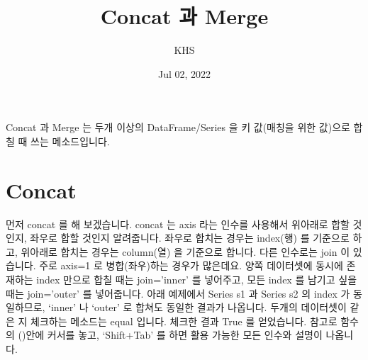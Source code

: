 \documentclass[letterpaper,10pt,english]{jupyterBook}
\title{Concat 과 Merge}
\date{Jul 02, 2022}
\author{KHS}
\begin{document}
\pagestyle{empty}
\sphinxmaketitle
\pagestyle{plain}
\sphinxtableofcontents
\pagestyle{normal}
\label{\detokenize{chapter2/2.2.2_Useful_Techniques::doc}}


\sphinxAtStartPar
Concat 과 Merge 는 두개 이상의 DataFrame/Series 을 키 값(매칭을 위한 값)으로 합칠 때 쓰는 메소드입니다.


\part{Concat}
\label{\detokenize{chapter2/2.2.2_Useful_Techniques:concat}}
\sphinxAtStartPar
먼저 concat 를 해 보겠습니다. concat 는 axis 라는 인수를 사용해서 위\sphinxhyphen{}아래로 합할 것인지, 좌\sphinxhyphen{}우로 합할 것인지 알려줍니다. 좌\sphinxhyphen{}우로 합치는 경우는 index(행) 를 기준으로 하고, 위\sphinxhyphen{}아래로 합치는 경우는 column(열) 을 기준으로 합니다. 다른 인수로는 join 이 있습니다. 주로 axis=1 로 병합(좌\sphinxhyphen{}우)하는 경우가 많은데요. 양쪽 데이터셋에 동시에 존재하는 index 만으로 합칠 때는 join=’inner’ 를 넣어주고, 모든 index 를 남기고 싶을 때는 join=’outer’ 를 넣어줍니다. 아래 예제에서 Series s1 과 Series s2 의 index 가 동일하므로, ‘inner’ 나 ‘outer’ 로 합쳐도 동일한 결과가 나옵니다. 두개의 데이터셋이 같은 지 체크하는 메소드는 equal 입니다. 체크한 결과 True 를 얻었습니다. 참고로 함수의 ()안에 커서를 놓고, ‘Shift+Tab’ 를 하면 활용 가능한 모든 인수와 설명이 나옵니다.
\end{document}
